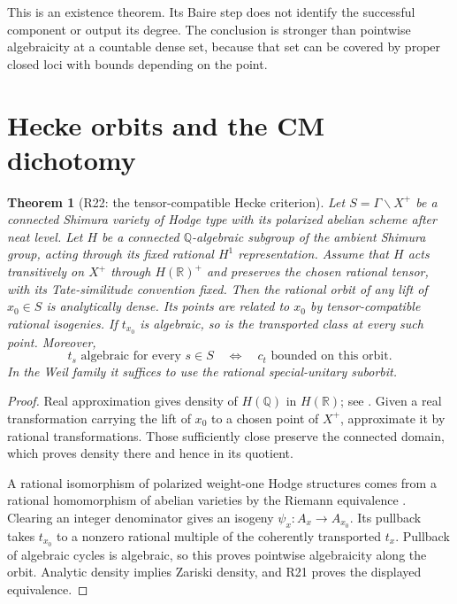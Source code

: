 \documentclass[11pt,a4paper]{article}
\newtheorem{theorem}{Theorem}[section]
\theoremstyle{definition}\newtheorem{definition}[theorem]{Definition}
\theoremstyle{remark}\newtheorem{remark}[theorem]{Remark}
\newcommand{\Q}{\mathbb Q}\newcommand{\Z}{\mathbb Z}\newcommand{\C}{\mathbb C}\newcommand{\R}{\mathbb R}
\begin{document}
This is an existence theorem. Its Baire step does not identify the successful component or output its degree. The conclusion is stronger than pointwise algebraicity at a countable dense set, because that set can be covered by proper closed loci with bounds depending on the point.

\section{Hecke orbits and the CM dichotomy}
\begin{theorem}[R22: the tensor-compatible Hecke criterion]\label{R22}
Let $S=\Gamma\backslash X^+$ be a connected Shimura variety of Hodge type with its polarized abelian scheme after neat level. Let $H$ be a connected $\Q$-algebraic subgroup of the ambient Shimura group, acting through its fixed rational $H^1$ representation. Assume that $H$ acts transitively on $X^+$ through $H(\R)^+$ and preserves the chosen rational tensor, with its Tate-similitude convention fixed. Then the rational orbit of any lift of $x_0\in S$ is analytically dense. Its points are related to $x_0$ by tensor-compatible rational isogenies. If $t_{x_0}$ is algebraic, so is the transported class at every such point. Moreover,
\[
 t_s\text{ algebraic for every }s\in S
 \quad\Longleftrightarrow\quad
 c_t\text{ bounded on this orbit}.
\]
In the Weil family it suffices to use the rational special-unitary suborbit.
\end{theorem}
\begin{proof}
Real approximation gives density of $H(\Q)$ in $H(\R)$; see \citet[Theorem~5.4, p.~54; Lemma~13.5, p.~118]{MilneShim}. Given a real transformation carrying the lift of $x_0$ to a chosen point of $X^+$, approximate it by rational transformations. Those sufficiently close preserve the connected domain, which proves density there and hence in its quotient.

A rational isomorphism of polarized weight-one Hodge structures comes from a rational homomorphism of abelian varieties by the Riemann equivalence \citep[Corollary~6.9, p.~73]{MilneShim}. Clearing an integer denominator gives an isogeny $\psi_x:A_x\to A_{x_0}$. Its pullback takes $t_{x_0}$ to a nonzero rational multiple of the coherently transported $t_x$. Pullback of algebraic cycles is algebraic, so this proves pointwise algebraicity along the orbit. Analytic density implies Zariski density, and R21 proves the displayed equivalence.
\end{proof}
\end{document}
